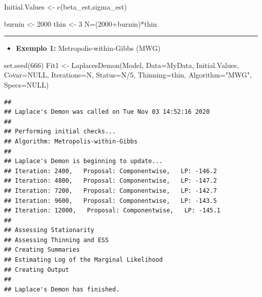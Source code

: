 \documentclass[
]{book}
\newenvironment{Shaded}{\begin{snugshade}}{\end{snugshade}}
\newcommand{\AttributeTok}[1]{\textcolor[rgb]{0.77,0.63,0.00}{#1}}
\newcommand{\ConstantTok}[1]{\textcolor[rgb]{0.00,0.00,0.00}{#1}}
\newcommand{\DecValTok}[1]{\textcolor[rgb]{0.00,0.00,0.81}{#1}}
\newcommand{\FunctionTok}[1]{\textcolor[rgb]{0.00,0.00,0.00}{#1}}
\newcommand{\NormalTok}[1]{#1}
\newcommand{\OtherTok}[1]{\textcolor[rgb]{0.56,0.35,0.01}{#1}}
\newcommand{\SpecialCharTok}[1]{\textcolor[rgb]{0.00,0.00,0.00}{#1}}
\newcommand{\StringTok}[1]{\textcolor[rgb]{0.31,0.60,0.02}{#1}}
\providecommand{\tightlist}{%
  \setlength{\itemsep}{0pt}\setlength{\parskip}{0pt}}
\begin{document}
\begin{Shaded}
\begin{Highlighting}[]
\NormalTok{Initial.Values }\OtherTok{\textless{}{-}} \FunctionTok{c}\NormalTok{(beta\_est,sigma\_est)}

\NormalTok{burnin }\OtherTok{\textless{}{-}} \DecValTok{2000}
\NormalTok{thin }\OtherTok{\textless{}{-}} \DecValTok{3}
\NormalTok{N}\OtherTok{=}\NormalTok{(}\DecValTok{2000}\SpecialCharTok{+}\NormalTok{burnin)}\SpecialCharTok{*}\NormalTok{thin}
\end{Highlighting}
\end{Shaded}

\begin{center}\rule{0.5\linewidth}{0.5pt}\end{center}

\begin{itemize}
\tightlist
\item
  \textbf{Exemplo 1:} Metropolis-within-Gibbs (MWG)
\end{itemize}

\begin{Shaded}
\begin{Highlighting}[]
\FunctionTok{set.seed}\NormalTok{(}\DecValTok{666}\NormalTok{)}
\NormalTok{Fit1 }\OtherTok{\textless{}{-}} \FunctionTok{LaplacesDemon}\NormalTok{(Model, }\AttributeTok{Data=}\NormalTok{MyData, Initial.Values,}
  \AttributeTok{Covar=}\ConstantTok{NULL}\NormalTok{, }\AttributeTok{Iterations=}\NormalTok{N, }\AttributeTok{Status=}\NormalTok{N}\SpecialCharTok{/}\DecValTok{5}\NormalTok{, }\AttributeTok{Thinning=}\NormalTok{thin,}
  \AttributeTok{Algorithm=}\StringTok{"MWG"}\NormalTok{, }\AttributeTok{Specs=}\ConstantTok{NULL}\NormalTok{)}
\end{Highlighting}
\end{Shaded}

\begin{verbatim}
## 
## Laplace's Demon was called on Tue Nov 03 14:52:16 2020
## 
## Performing initial checks...
## Algorithm: Metropolis-within-Gibbs 
## 
## Laplace's Demon is beginning to update...
## Iteration: 2400,   Proposal: Componentwise,   LP: -146.2
## Iteration: 4800,   Proposal: Componentwise,   LP: -147.2
## Iteration: 7200,   Proposal: Componentwise,   LP: -142.7
## Iteration: 9600,   Proposal: Componentwise,   LP: -143.5
## Iteration: 12000,   Proposal: Componentwise,   LP: -145.1
## 
## Assessing Stationarity
## Assessing Thinning and ESS
## Creating Summaries
## Estimating Log of the Marginal Likelihood
## Creating Output
## 
## Laplace's Demon has finished.
\end{verbatim}
\end{document}
